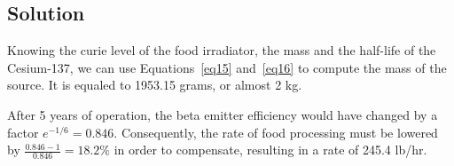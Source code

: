 \subsection{Solution}

Knowing the curie level of the food irradiator, the mass and the half-life of the Cesium-137, we can use Equations~\ref{eq15} and~\ref{eq16} to compute the mass of the source. It is equaled to 1953.15 grams, or almost 2 kg.

After 5 years of operation, the beta emitter efficiency would have changed by a factor $e^{-1/6} = 0.846$. Consequently, the rate of food processing must be lowered by $\frac{0.846 - 1}{0.846} = 18.2\%$ in order to compensate, resulting in a rate of 245.4 lb/hr.



